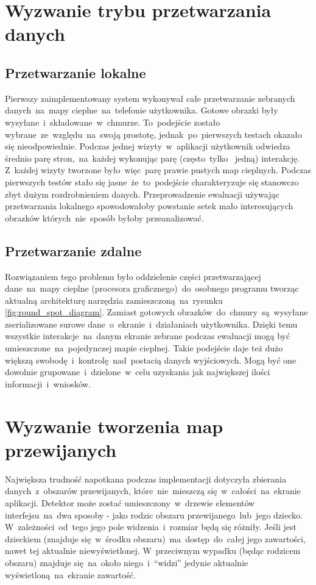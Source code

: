 \section{Wyzwanie trybu przetwarzania danych}

\subsection{Przetwarzanie lokalne}
Pierwszy zaimplementowany system wykonywał całe przetwarzanie zebranych danych~na~mapy cieplne~na~telefonie użytkownika. Gotowe obrazki były wysyłane~i~składowane~w~chmurze. To~podejście zostało wybrane~ze~względu~na~swoją prostotę, jednak~po~pierwszych testach okazało się nieodpowiednie. Podczas jednej wizyty~w~aplikacji  użytkownik odwiedza średnio parę stron,~na~każdej wykonując parę (często~tylko~ jedną) interakcję. Z~każdej wizyty tworzone było~więc~parę prawie pustych map cieplnych. Podczas pierwszych testów stało się jasne~że~to~podejście charakteryzuje się stanowczo zbyt dużym rozdrobnieniem danych. Przeprowadzenie ewaluacji używając przetwarzania lokalnego spowodowałoby powstanie setek mało interesujących obrazków których~nie~sposób byłoby przeanalizować.

\subsection{Przetwarzanie zdalne}
Rozwiązaniem tego problemu było oddzielenie części przetwarzającej dane~na~mapy cieplne (procesora graficznego)~do~osobnego programu tworząc aktualną architekturę narzędzia zamieszczoną~na~rysunku \ref{fig:round_spot_diagram}. Zamiast gotowych obrazków~do~chmury~są~wysyłane zserializowane surowe dane~o~ekranie~i~działaniach użytkownika. Dzięki temu wszystkie interakcje~na~danym ekranie zebrane podczas ewaluacji mogą być umieszczone~na~pojedynczej mapie cieplnej. Takie podejście daje też dużo większą swobodę~i~kontrolę~nad~postacią danych wyjściowych. Mogą być one dowolnie grupowane~i~dzielone~w~celu uzyskania jak największej ilości informacji~i~wniosków.

\section{Wyzwanie tworzenia map przewijanych}
Największa trudność napotkana podczas implementacji dotyczyła zbierania danych~z~obszarów przewijanych, które~nie~mieszczą się~w~całości~na~ekranie aplikacji. Detektor może zostać umieszczony~w~drzewie elementów interfejsu~na~dwa sposoby - jako rodzic obszaru przewijanego~lub~jego dziecko. W~zależności~od~tego jego pole widzenia~i~rozmiar będą się różniły. Jeśli jest dzieckiem (znajduje się~w~środku obszaru)~ma~dostęp~do~całej jego zawartości, nawet tej aktualnie niewyświetlonej. W~przeciwnym wypadku (będąc rodzicem obszaru) znajduje się~na~około niego~i~``widzi'' jedynie aktualnie wyświetloną~na~ekranie zawartość.

